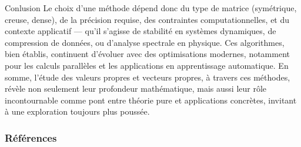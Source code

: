 \documentclass[french, 10pt]{beamer}
\theoremstyle{definition}
\begin{document}
\begin{frame}{Conlusion}
	Le choix d’une méthode dépend donc du type de matrice (symétrique, creuse, dense), de la précision requise, des contraintes computationnelles, et du contexte applicatif — qu’il s’agisse de stabilité en systèmes dynamiques, de compression de données, ou d’analyse spectrale en physique. Ces algorithmes, bien établis, continuent d’évoluer avec des optimisations modernes, notamment pour les calculs parallèles et les applications en apprentissage automatique. En somme, l’étude des valeurs propres et vecteurs propres, à travers ces méthodes, révèle non seulement leur profondeur mathématique, mais aussi leur rôle incontournable comme pont entre théorie pure et applications concrètes, invitant à une exploration toujours plus poussée.
\end{frame}

\begin{frame}[allowframebreaks]
	\frametitle{Références}
	
	

\end{frame}
\end{document}
